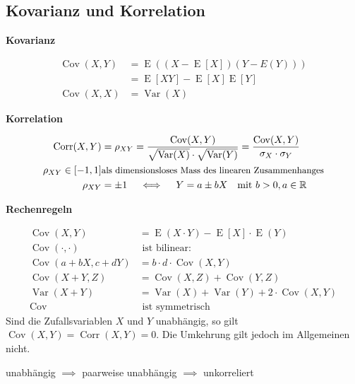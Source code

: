 \documentclass[25pt]{sciposter}
\newcommand{\R}{\mathbb{R}}
\newcommand{\Var}{\operatorname{Var}}
\newcommand{\E}{\operatorname{E}}
\newenvironment{method}[1]{\begin{mdframed}[backgroundcolor=blue!10,innertopmargin=15pt, innerbottommargin=15pt,nobreak=true]
		\textbf{#1 }
	}
	{ 
	\end{mdframed}
}
\newenvironment{thm}[1]{\begin{mdframed}[backgroundcolor=pink!20,innertopmargin=15pt, innerbottommargin=15pt, nobreak=true]
		\textbf{#1 }
	}
	{ 
	\end{mdframed}
}
\begin{document}
\begin{multicols}{3}
\subsection*{Kovarianz und Korrelation}


\begin{method}{Kovarianz}
	\begin{align*}	
	\operatorname{Cov}(X,Y) &= \E\left(\left(X-\E[X]\right)\left(Y-E(Y)\right)\right) \\ &= \E[XY]  - \E[X]\E[Y]\\
	\operatorname{Cov}(X,X) &= \Var(X)
	\end{align*}
\end{method}

\begin{method}{Korrelation}
	\begin{align*}
	\operatorname{Corr}(X,Y) &= \rho_{XY} = \frac{\operatorname{Cov}(X,Y)}{\sqrt{\Var(X)} \cdot \sqrt{\Var(Y)}}
	= \frac{\operatorname{Cov}(X,Y)}{\sigma_X\cdot\sigma_Y} \\
	\rho_{XY} \in [-1,1] &  \text{\small als dimensionsloses Mass des linearen Zusammenhanges} \\
	\rho_{XY} &=\pm 1 \quad \iff \quad Y = a\pm bX \quad \text{mit }b>0, a \in \R
	\end{align*}
\end{method}

\begin{thm}{Rechenregeln}
	\begin{align*}
	\operatorname{Cov}(X,Y) &= \E(X\cdot Y) - \E[X] \cdot \E(Y) \\
	\operatorname{Cov}(\cdot,\cdot) &\text{ ist bilinear:} \quad \\
	\operatorname{Cov}(a+bX,c+dY) &= b\cdot d \cdot \operatorname{Cov} (X,Y) \\
	\operatorname{Cov}(X+Y,Z) &= \operatorname{Cov}(X,Z)+\operatorname{Cov}(Y,Z) \\
	\Var(X+Y) &= \Var(X)+\Var(Y)+2 \cdot \operatorname{Cov}(X,Y) \\
	\operatorname{Cov} &\text{ ist symmetrisch}
	\end{align*}
	Sind die Zufallsvariablen $X$ und $Y$ unabhängig, so gilt $\operatorname{Cov}(X,Y) = \operatorname{Corr}(X,Y) = 0$.
	Die Umkehrung gilt jedoch im Allgemeinen nicht.
\end{thm}



\begin{mdframed}
	\centering
	{unabhängig $\implies$ paarweise unabhängig $\implies$ unkorreliert}
\end{mdframed}



\end{multicols}
\end{document}
